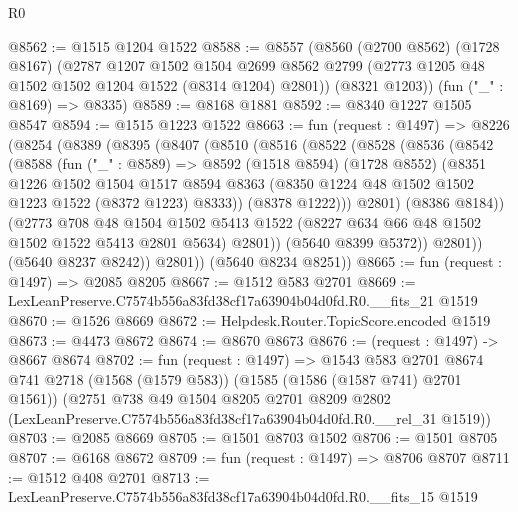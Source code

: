 \begin{lexlean}{R0}
\begin{coremodule}
@8562 := @1515 @1204 @1522
@8588 := @8557
    (@8560
      (@2700 @8562)
      (@1728 @8167)
      (@2787
        @1207
        @1502
        @1504
        @2699
        @8562
        @2799
        (@2773 @1205 @48 @1502 @1502 @1204 @1522 (@8314 @1204) @2801))
      (@8321 @1203))
    (fun ("_" : @8169) => @8335)
@8589 := @8168 @1881
@8592 := @8340 @1227 @1505 @8547
@8594 := @1515 @1223 @1522
@8663 := fun (request : @1497) =>
  @8226
    (@8254
      (@8389
        (@8395
          (@8407
            (@8510
              (@8516
                (@8522
                  (@8528
                    (@8536
                      (@8542
                        (@8588
                          (fun ("_" : @8589) =>
                          @8592
                            (@1518 @8594)
                            (@1728 @8552)
                            (@8351
                              @1226
                              @1502
                              @1504
                              @1517
                              @8594
                              @8363
                              (@8350 @1224 @48 @1502 @1502 @1223 @1522 (@8372 @1223) @8333))
                            (@8378 @1222)))
                        @2801)
                      (@8386 @8184))
                    (@2773
                      @708
                      @48
                      @1504
                      @1502
                      @5413
                      @1522
                      (@8227 @634 @66 @48 @1502 @1502 @1522 @5413 @2801 @5634)
                      @2801))
                  (@5640 @8399 @5372))
                @2801))
            (@5640 @8237 @8242))
          @2801))
      (@5640 @8234 @8251))
@8665 := fun (request : @1497) => @2085 @8205
@8667 := @1512 @583 @2701
@8669 := LexLeanPreserve.C7574b556a83fd38cf17a63904b04d0fd.R0.__fits_21 @1519
@8670 := @1526 @8669
@8672 := Helpdesk.Router.TopicScore.encoded @1519
@8673 := @4473 @8672
@8674 := @8670 @8673
@8676 := (request : @1497) -> @8667 @8674
@8702 := fun (request : @1497) =>
  @1543
    @583
    @2701
    @8674
    @741
    @2718
    (@1568 (@1579 @583))
    (@1585 (@1586 (@1587 @741) @2701 @1561))
    (@2751
      @738
      @49
      @1504
      @8205
      @2701
      @8209
      @2802
      (LexLeanPreserve.C7574b556a83fd38cf17a63904b04d0fd.R0.__rel_31 @1519))
@8703 := @2085 @8669
@8705 := @1501 @8703 @1502
@8706 := @1501 @8705
@8707 := @6168 @8672
@8709 := fun (request : @1497) => @8706 @8707
@8711 := @1512 @408 @2701
@8713 := LexLeanPreserve.C7574b556a83fd38cf17a63904b04d0fd.R0.__fits_15 @1519

\end{coremodule}
\end{lexlean}

